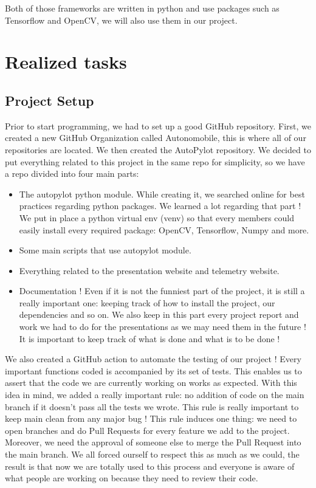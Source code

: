 \documentclass[12pt]{article}
\begin{document}
Both of those frameworks are written in python and use packages such as Tensorflow and OpenCV, we will also use them in our project.
\newpage



\section{Realized tasks}

\subsection{Project Setup}
Prior to start programming, we had to set up a good GitHub repository. First, we created a new GitHub Organization called Autonomobile, this is where all of our repositories are located. We then created the AutoPylot repository. We decided to put everything related to this project in the same repo for simplicity, so we have a repo divided into four main parts:
\begin{itemize}
\item The autopylot python module. While creating it, we searched online for best practices regarding python packages. We learned a lot regarding that part ! We put in place a python virtual env (venv) so that every members could easily install every required package: OpenCV, Tensorflow, Numpy and more.
\item Some main scripts that use autopylot module.
\item Everything related to the presentation website and telemetry website.
\item Documentation ! Even if it is not the funniest part of the project, it is still a really important one: keeping track of how to install the project, our dependencies and so on. We also keep in this part every project report and work we had to do for the presentations as we may need them in the future ! It is important to keep track of what is done and what is to be done !
\end{itemize}
We also created a GitHub action to automate the testing of our project ! Every important functions coded is accompanied by its set of tests. This enables us to assert that the code we are currently working on works as expected. With this idea in mind, we added a really important rule: no addition of code on the main branch if it doesn't pass all the tests we wrote. This rule is really important to keep main clean from any major bug ! This rule induces one thing: we need to open branches and do Pull Requests for every feature we add to the project. Moreover, we need the approval of someone else to merge the Pull Request into the main branch. We all forced ourself to respect this as much as we could, the result is that now we are totally used to this process and everyone is aware of what people are working on because they need to review their code.
\end{document}
